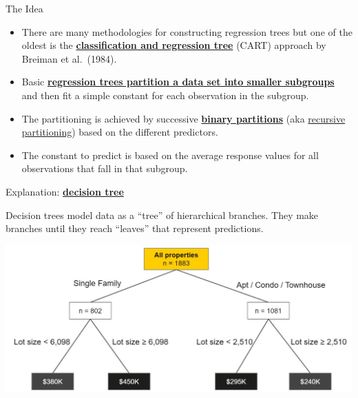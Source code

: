\documentclass[
  10pt,
  ignorenonframetext,
]{beamer}
\providecommand{\tightlist}{%
  \setlength{\itemsep}{0pt}\setlength{\parskip}{0pt}}
\begin{document}
\begin{frame}{The Idea}
\protect\hypertarget{the-idea}{}

\begin{itemize}
\tightlist
\item
  There are many methodologies for constructing regression trees but one
  of the oldest is the
  \href{https://machinelearningmastery.com/classification-and-regression-trees-for-machine-learning/}{\textbf{classification
  and regression tree}} (CART) approach by Breiman et al.~(1984).
\item
  Basic
  \href{https://towardsdatascience.com/the-complete-guide-to-decision-trees-28a4e3c7be14}{\textbf{regression
  trees partition a data set into smaller subgroups}} and then fit a
  simple constant for each observation in the subgroup.
\item
  The partitioning is achieved by successive
  \href{https://en.wikipedia.org/wiki/Binary_space_partitioning}{\textbf{binary
  partitions}} (aka
  \href{https://en.wikipedia.org/wiki/Recursive_partitioning}{recursive
  partitioning}) based on the different predictors.
\item
  The constant to predict is based on the average response values for
  all observations that fall in that subgroup.
\end{itemize}

\end{frame}

\begin{frame}{Explanation:
\href{https://en.wikipedia.org/wiki/Decision_tree}{\textbf{decision
tree}}}
\protect\hypertarget{explanation-decision-tree}{}

Decision trees model data as a ``tree'' of hierarchical branches. They
make branches until they reach ``leaves'' that represent predictions.

\includegraphics{figure/Decision-Tree-Example.jpg}

\end{frame}
\end{document}
